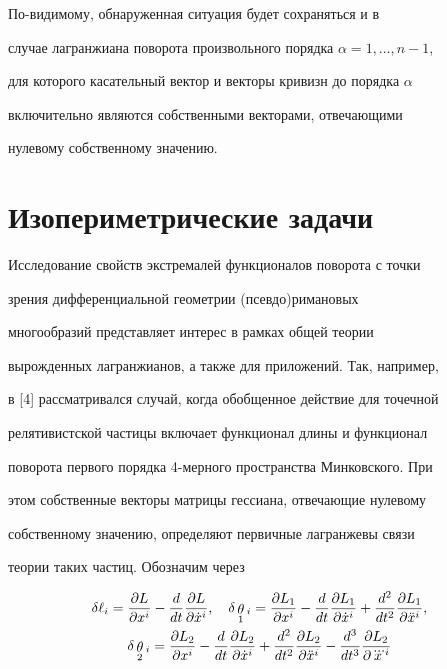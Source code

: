  


 


По-видимому, обнаруженная ситуация будет сохраняться и в 


случае лагранжиана поворота произвольного порядка $\alpha=1,\dotsc,n-1$, 


для которого касательный вектор и векторы кривизн до порядка $\alpha$


включительно являются собственными векторами, отвечающими 


нулевому собственному значению. 


 


 


\section{Изопериметрические задачи} 


 


Исследование свойств экстремалей функционалов поворота с точки 


зрения дифференциальной геометрии (псевдо)римановых 


многообразий представляет интерес в рамках общей теории 


вырожденных лагранжианов, а также для приложений. Так, например, 


в [4] рассматривался случай, когда обобщенное действие для точечной 


релятивистской частицы включает функционал длины и функционал 


поворота первого порядка 4-мерного пространства Минковского. При 


этом собственные векторы матрицы гессиана, отвечающие нулевому 


собственному значению, определяют первичные лагранжевы связи 


теории таких частиц. Обозначим через 


\begin{gather*} 


\delta\ell_i=\frac{\partial L}{\partial x^i}-\frac{d}{dt} 


\frac{\partial L}{\partial\Dot x{}^i},\quad 


\delta\mymath{\theta}_1{}_i=\frac{\partial L_1}{\partial x^i}- 


\frac{d}{dt}\frac{\partial L_1}{\partial\Dot x{}^i}+ 


\frac{d^2}{dt^2}\frac{\partial L_1}{\partial\Ddot x{}^i},\\ 


\delta\mymath{\theta}_2{}_i=\frac{\partial L_2}{\partial x^i}- 


\frac{d}{dt}\frac{\partial L_2}{\partial\Dot x{}^i}+ 


\frac{d^2}{dt^2}\frac{\partial L_2}{\partial\Ddot x{}^i}- 


\frac{d^3}{dt^3}\frac{\partial L_2}{\partial\dddot{x}^i}  %


\end{gather*} 


